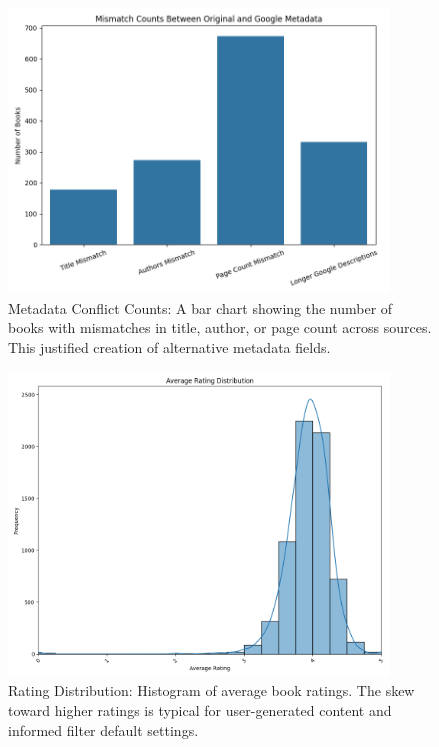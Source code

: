 \begin{figure}[H]
    \centering
    \includegraphics[width=0.9\textwidth]{figures/reexp_mismatch_counts.png}
    \caption{Metadata Conflict Counts: A bar chart showing the number of books with mismatches in title, author, or page count across sources. This justified creation of alternative metadata fields.}
\end{figure}

\begin{figure}[H]
    \centering
    \includegraphics[width=0.9\textwidth]{figures/rating_distribution.png}
    \caption{Rating Distribution: Histogram of average book ratings. The skew toward higher ratings is typical for user-generated content and informed filter default settings.}
\end{figure}

